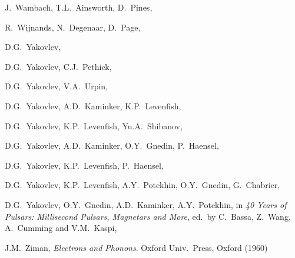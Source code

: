 \documentclass[smallextended]{svjour3}       %
\begin{document}
\begin{thebibliography}{}
J.~Wambach, T.L.~Ainsworth, D.~Pines,

R.~Wijnands, N.~Degenaar, D.~Page,

D.G.~Yakovlev,

D.G.~Yakovlev, C.J.~Pethick,

D.G.~Yakovlev, V.A.~Urpin,

D.G.~Yakovlev, A.D.~Kaminker, K.P.~Levenfish,

D.G.~Yakovlev, K.P.~Levenfish, Yu.A.~Shibanov,

D.G.~Yakovlev, A.D.~Kaminker, O.Y.~Gnedin, P.~Haensel,

D.G.~Yakovlev, K.P.~Levenfish, P.~Haensel,

D.G.~Yakovlev, K.P.~Levenfish, A.Y.~Potekhin, O.Y.~Gnedin, G.~Chabrier,

D.G.~Yakovlev, O.Y.~Gnedin, A.D.~Kaminker, A.Y.~Potekhin,
in 
\textit{40 Years of Pulsars: Millisecond Pulsars, Magnetars and More},
ed.~by C.~Bassa, Z.~Wang, A.~Cumming and V.M.~Kaspi,

J.M.~Ziman,
\textit{Electrons and Phonons}.
Oxford Univ.\ Press, Oxford (1960)
\end{thebibliography}
\end{document}
